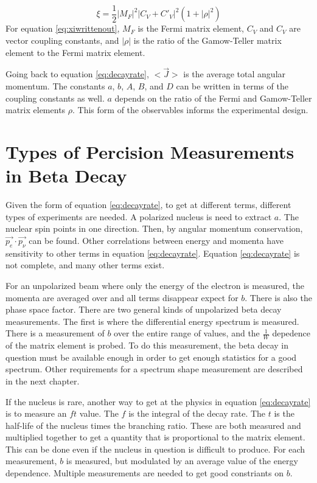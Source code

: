 \documentclass[main.tex]{subfiles}
\begin{document}
\begin{equation}
	\xi = \frac{1}{2} |M_{F}|^{2} |C_{V} + C'_{V}|^{2} (1 + |\rho|^{2})
	\label{eq:xiwrittenout}
\end{equation}
For equation \ref{eq:xiwrittenout}, $M_{F}$ is the Fermi matrix element, $C_{V}$ and $C_{V}$ are vector coupling constants, and $|\rho|$ is the ratio of the Gamow-Teller matrix element to the Fermi matrix element.
\cite{Gon19}

Going back to equation \ref{eq:decayrate}, $<\vec{J}>$ is the average total angular momentum. 
The constants $a$, $b$, $A$, $B$, and $D$ can be written in terms of the coupling constants as well.
$a$ depends on the ratio of the Fermi and Gamow-Teller matrix elements $\rho$.
This form of the observables informs the experimental design. 

\section{Types of Percision Measurements in Beta Decay}
Given the form of equation \ref{eq:decayrate}, to get at different terms, different types of experiments are needed.
A polarized nucleus is need to extract $a$. 
The nuclear spin points in one direction. 
Then, by angular momentum conservation, $\vec{p_{e}} \cdot \vec{p_{\nu}}$ can be found.
Other correlations between energy and momenta have sensitivity to other terms in equation \ref{eq:decayrate}.
Equation \ref{eq:decayrate} is not complete, and many other terms exist. 

For an unpolarized beam where only the energy of the electron is measured, the momenta are averaged over and all terms disappear expect for $b$.
There is also the phase space factor.
There are two general kinds of unpolarized beta decay measurements.
The first is where the differential energy spectrum is measured.
There is a measurement of $b$ over the entire range of values, and the $\frac{1}{W}$ depedence of the matrix element is probed.
To do this measurement, the beta decay in question must be available enough in order to get enough statistics for a good spectrum.
Other requirements for a spectrum shape measurement are described in the next chapter.

If the nucleus is rare, another way to get at the physics in equation \ref{eq:decayrate} is to measure an $ft$ value.
The $f$ is the integral of the decay rate.
The $t$ is the half-life of the nucleus times the branching ratio.
These are both measured and multiplied together to get a quantity that is proportional to the matrix element.
This can be done even if the nucleus in question is difficult to produce.
For each measurement, $b$ is measured, but modulated by an average value of the energy dependence.
Multiple measurements are needed to get good constriants on $b$.
\end{document}
